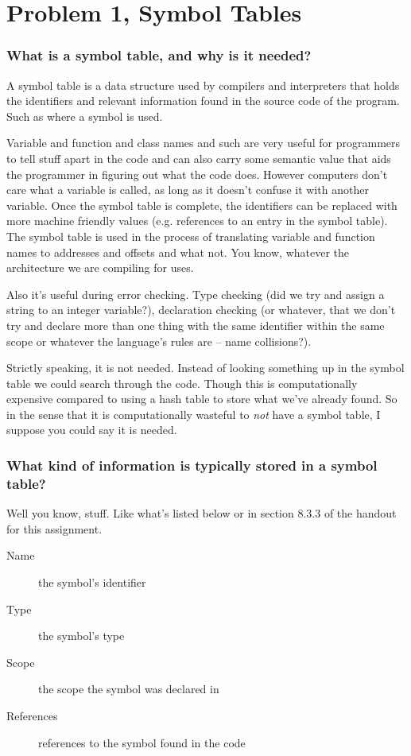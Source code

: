\section{Problem 1, Symbol Tables}
\subsubsection{What is a symbol table, and why is it needed?}
A symbol table is a data structure used by compilers and interpreters that holds the identifiers and relevant information found in the source code of the program.
Such as where a symbol is used.

Variable and function and class names and such are very useful for programmers to tell stuff apart in the code and can also carry some semantic value that aids the programmer in figuring out what the code does.
However computers don't care what a variable is called, as long as it doesn't confuse it with another variable.
Once the symbol table is complete, the identifiers can be replaced with more machine friendly values (e.g. references to an entry in the symbol table).
The symbol table is used in the process of translating variable and function names to addresses and offsets and what not.
You know, whatever the architecture we are compiling for uses.

Also it's useful during error checking.
Type checking (did we try and assign a string to an integer variable?), declaration checking (or whatever, that we don't try and declare more than one thing with the same identifier within the same scope or whatever the language's rules are -- name collisions?).

Strictly speaking, it is not needed.
Instead of looking something up in the symbol table we could search through the code.
Though this is computationally expensive compared to using a hash table to store what we've already found.
So in the sense that it is computationally wasteful to \emph{not} have a symbol table, I suppose you could say it is needed.


\subsubsection{What kind of information is typically stored in a symbol table?}
Well you know, stuff.
Like what's listed below or in section 8.3.3 of the handout for this assignment.
\begin{description}
	\item[Name] the symbol's identifier
	\item[Type] the symbol's type
	\item[Scope] the scope the symbol was declared in
	\item[References] references to the symbol found in the code
\end{description}

